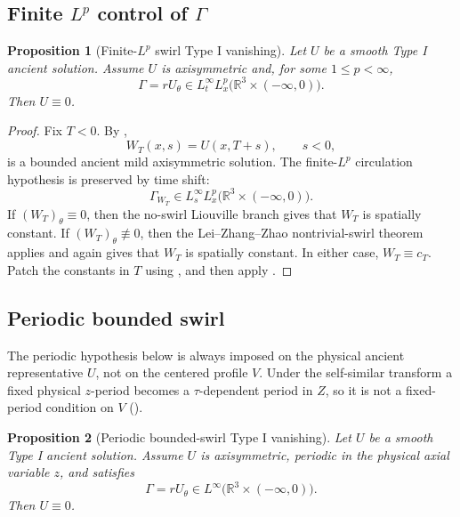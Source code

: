 \documentclass[11pt]{amsart}
\theoremstyle{plain}
\newtheorem{proposition}[proposition]{Proposition}
\theoremstyle{definition}
\theoremstyle{remark}
\numberwithin{equation}{section}
\begin{document}
\subsection{\texorpdfstring{Finite \(L^p\) control of \(\Gamma\)}
{Finite Lp control of Gamma}}

\begin{proposition}[Finite-\(L^p\) swirl Type I vanishing]
\label{p3:prop:lp-swirl-typeI}
Let \(U\) be a smooth Type I ancient solution.  Assume \(U\) is axisymmetric
and, for some \(1\le p<\infty\),
\[
   \Gamma=rU_\theta\in L_t^\infty L_x^p
   \bigl(\mathbb R^3\times(-\infty,0)\bigr).
\]
Then \(U\equiv0\).
\end{proposition}

\begin{proof}
Fix \(T<0\).  By ,
\[
   W_T(x,s)=U(x,T+s),\qquad s<0,
\]
is a bounded ancient mild axisymmetric solution.  The finite-\(L^p\)
circulation hypothesis is preserved by time shift:
\[
   \Gamma_{W_T}\in L_s^\infty L_x^p
   \bigl(\mathbb R^3\times(-\infty,0)\bigr).
\]
If \((W_T)_\theta\equiv0\), then the no-swirl Liouville branch gives that
\(W_T\) is spatially constant.  If \((W_T)_\theta\not\equiv0\), then the
Lei--Zhang--Zhao nontrivial-swirl theorem applies and again gives that
\(W_T\) is spatially constant.  In either case, \(W_T\equiv c_T\).
Patch the constants in \(T\) using , and then
apply .
\end{proof}

\subsection{Periodic bounded swirl}

The periodic hypothesis below is always imposed on the physical ancient
representative \(U\), not on the centered profile \(V\).  Under the
self-similar transform a fixed physical \(z\)-period becomes a
\(\tau\)-dependent period in \(Z\), so it is not a fixed-period condition on
\(V\) ().

\begin{proposition}[Periodic bounded-swirl Type I vanishing]
\label{p3:prop:periodic-swirl-typeI}
Let \(U\) be a smooth Type I ancient solution.  Assume \(U\) is axisymmetric,
periodic in the physical axial variable \(z\), and satisfies
\[
   \Gamma=rU_\theta\in L^\infty
   \bigl(\mathbb R^3\times(-\infty,0)\bigr).
\]
Then \(U\equiv0\).
\end{proposition}
\end{document}
